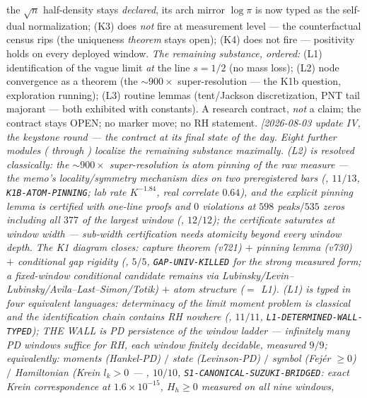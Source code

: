 the $\sqrt{n}$ half-density stays \emph{declared}, its arch mirror
$\log\pi$ is now typed as the self-dual normalization; (K3) does
\emph{not} fire at measurement level --- the counterfactual census
rips (the uniqueness \emph{theorem} stays open); (K4) does not fire
--- positivity holds on every deployed window.  \emph{The remaining
substance, ordered:} (L1) identification of the vague limit
\emph{at} the line $s=1/2$ (no mass loss); (L2) node convergence as
a theorem (the ${\sim}900\times$ super-resolution --- the K1b
question, exploration running); (L3) routine lemmas (tent/Jackson
discretization, PNT tail majorant --- both exhibited with
constants).  A research contract, \emph{not} a claim; the contract
stays OPEN; no marker move; no RH statement.
\emph{[2026-08-03 update IV, the keystone round --- the contract at
its final state of the day.  Eight further modules
( through
) localize the remaining substance
maximally.  \emph{(L2) is resolved classically:} the
${\sim}900\times$ super-resolution is \emph{atom pinning} of the
raw measure --- the memo's locality/symmetry mechanism dies on two
preregistered bars (, $11/13$,
\texttt{K1B-ATOM-PINNING}; lab rate $K^{-1.84}$, real correlate
$0.64$), and the explicit pinning lemma is certified with one-line
proofs and $0$ violations at $598$ peaks$/535$ zeros including all
$377$ of the largest window
(, $12/12$); the certificate
saturates at window width --- sub-width certification needs
atomicity beyond every window depth.  The K1 diagram closes:
capture theorem (v721) $+$ pinning lemma (v730) $+$ conditional gap
rigidity (, $5/5$,
\texttt{GAP-UNIV-KILLED} for the strong measured form; a
fixed-window conditional candidate remains via
Lubinsky/Levin--Lubinsky/Avila--Last--Simon/Totik) $+$ atom
structure ($=$ L1).  \emph{(L1) is typed in four equivalent
languages:} determinacy of the limit moment problem is
\emph{classical} and the identification chain contains RH nowhere
(, $11/11$,
\texttt{L1-DETERMINED-WALL-TYPED}); THE WALL is \emph{PD
persistence of the window ladder} --- infinitely many PD windows
suffice for RH, each window finitely decidable, measured $9/9$;
equivalently: moments (Hankel-PD) $/$ state (Levinson-PD) $/$
symbol (Fej\'er $\ge0$) $/$ Hamiltonian (Krein $l_k>0$ ---
, $10/10$,
\texttt{S1-CANONICAL-SUZUKI-BRIDGED}: exact Krein correspondence at
$1.6\times10^{-15}$, $H_h\ge0$ measured on all nine windows,
}
